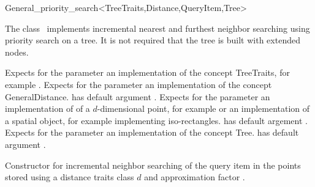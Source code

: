 

\begin{ccRefClass}{General_priority_search<TreeTraits,Distance,QueryItem,Tree>}  %


\ccDefinition

The class \ccRefName\ implements incremental nearest and furthest neighbor searching
using priority search on a tree. It is not required that the tree is
built with extended nodes.


\ccParameters

Expects for the parameter  an implementation of the concept TreeTraits,
for example .
Expects for the parameter  an implementation of the
concept GeneralDistance.  has default argument 
.
Expects for the parameter   an implementation of
of a $d$-dimensional point, for example 
or an implementation of a spatial object, for
example  implementing iso-rectangles.
 has default argement .
Expects for the parameter  an implementation of the concept Tree.
 has default argument .

\ccTypes


\ccCreation
{}  %

{Constructor for incremental neighbor searching of the query item 
in the points stored  using a distance
traits class $d$ and approximation factor .}


\end{ccRefClass}
